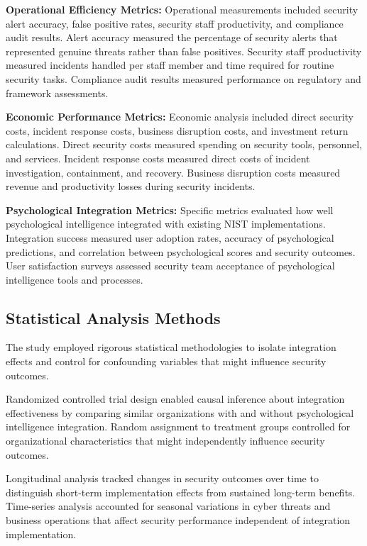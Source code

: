 \documentclass[10pt, twocolumn]{article}
\begin{document}
\textbf{Operational Efficiency Metrics:} Operational measurements included security alert accuracy, false positive rates, security staff productivity, and compliance audit results. Alert accuracy measured the percentage of security alerts that represented genuine threats rather than false positives. Security staff productivity measured incidents handled per staff member and time required for routine security tasks. Compliance audit results measured performance on regulatory and framework assessments.

\textbf{Economic Performance Metrics:} Economic analysis included direct security costs, incident response costs, business disruption costs, and investment return calculations. Direct security costs measured spending on security tools, personnel, and services. Incident response costs measured direct costs of incident investigation, containment, and recovery. Business disruption costs measured revenue and productivity losses during security incidents.

\textbf{Psychological Integration Metrics:} Specific metrics evaluated how well psychological intelligence integrated with existing NIST implementations. Integration success measured user adoption rates, accuracy of psychological predictions, and correlation between psychological scores and security outcomes. User satisfaction surveys assessed security team acceptance of psychological intelligence tools and processes.

\subsection{Statistical Analysis Methods}

The study employed rigorous statistical methodologies to isolate integration effects and control for confounding variables that might influence security outcomes.

Randomized controlled trial design enabled causal inference about integration effectiveness by comparing similar organizations with and without psychological intelligence integration. Random assignment to treatment groups controlled for organizational characteristics that might independently influence security outcomes.

Longitudinal analysis tracked changes in security outcomes over time to distinguish short-term implementation effects from sustained long-term benefits. Time-series analysis accounted for seasonal variations in cyber threats and business operations that affect security performance independent of integration implementation.
\end{document}
